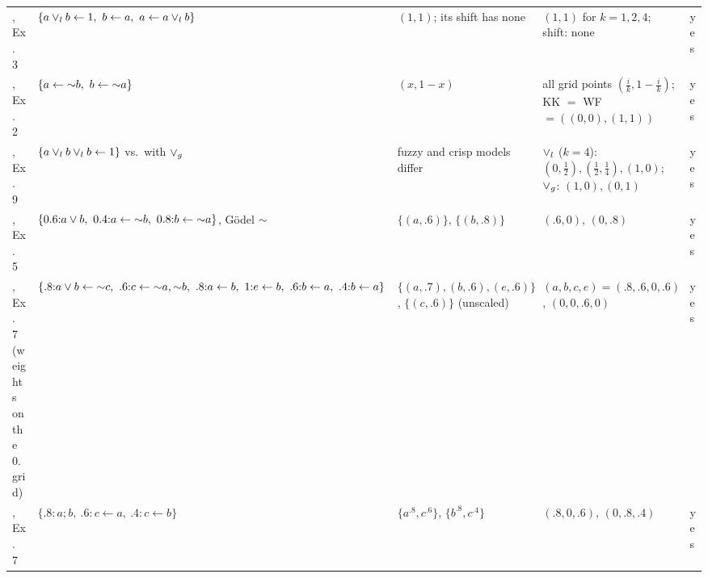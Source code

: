 {\begin{longtable}{@{}p{}p{}p{}p{}p{}@{}}
            \cite{MushthofaSD20}, Ex.~3                          & $\{a\lor_l b\leftarrow1,\ b\leftarrow a,\ a\leftarrow a\lor_l b\}$                                                                                            & $(1,1)$; its shift has none                                           & $(1,1)$ for $k=1,2,4$; shift: none                                                                                              & yes                       \\
            \cite{BlondeelSVD14}, Ex.~2                          & $\{a\leftarrow\flpnot  b,\ b\leftarrow\flpnot  a\}$                                                                                                               & $(x,1-x)$                                                             & all grid points $(\frac ik,1-\frac ik)$; KK $=$ WF $=((0,0),(1,1))$                                                             & yes                       \\
            \cite{SchockaertJV12}, Ex.~9                         & $\{a\lor_l b\lor_l b\leftarrow1\}$ vs.\ with $\lor_g$                                                                                                       & fuzzy and crisp models differ                                         & $\lor_l$ ($k=4$): $(0,\frac12),(\frac12,\frac14),(1,0)$; $\lor_g$: $(1,0),(0,1)$                                            & yes                       \\
            \cite{NievesOC13}, Ex.~5                             & $\{0.6{:}a\lor b,\ 0.4{:}a\leftarrow\mathord{\sim}  b,\ 0.8{:}b\leftarrow\mathord{\sim}  a\}$, Gödel $\mathord{\sim} $                                                                 & $\{(a,.6)\}$, $\{(b,.8)\}$                                            & $(.6,0)$, $(0,.8)$                                                                                                              & yes                       \\
            \cite{NievesOC13}, Ex.~7 (weights on the $0.2$ grid) & $\{.8{:}a\lor b\leftarrow\flpnot  c,\ .6{:}c\leftarrow\flpnot  a,\flpnot  b,\ .8{:}a\leftarrow b,\ 1{:}e\leftarrow b,\ .6{:}b\leftarrow a,\ .4{:}b\leftarrow a\}$ & $\{(a,.7),(b,.6),(e,.6)\}$, $\{(c,.6)\}$ (unscaled)                   & $(a,b,c,e)=(.8,.6,0,.6)$, $(0,0,.6,0)$                                                                                          & yes                       \\
            \cite{BautersSDV14tplp}, Ex.~7                       & $\{.8{:}a;b,\ .6{:}c\leftarrow a,\ .4{:}c\leftarrow b\}$                                                                                                          & $\{a^{.8},c^{.6}\}$, $\{b^{.8},c^{.4}\}$                              & $(.8,0,.6)$, $(0,.8,.4)$                                                                                                        & yes                       \\

\end{longtable}}
